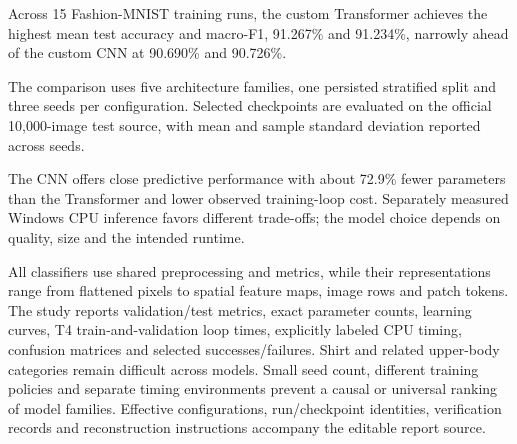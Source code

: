 Across 15 Fashion-MNIST training runs, the custom Transformer achieves the highest
mean test accuracy and macro-F1, 91.267\% and 91.234\%, narrowly ahead of the
custom CNN at 90.690\% and 90.726\%.

The comparison uses five architecture families, one persisted stratified split and
three seeds per configuration. Selected checkpoints are evaluated on the official
10,000-image test source, with mean and sample standard deviation reported across seeds.

The CNN offers close predictive performance with about 72.9\% fewer parameters
than the Transformer and lower observed training-loop cost. Separately measured
Windows CPU inference favors different trade-offs; the model choice depends on
quality, size and the intended runtime.

All classifiers use shared preprocessing and metrics, while their representations
range from flattened pixels to spatial feature maps, image rows and patch tokens.
The study reports validation/test metrics, exact parameter counts, learning curves,
T4 train-and-validation loop times, explicitly labeled CPU timing, confusion
matrices and selected successes/failures. Shirt and related upper-body categories
remain difficult across models. Small seed count, different training policies and
separate timing environments prevent a causal or universal ranking of model families.
Effective configurations, run/checkpoint identities, verification records and
reconstruction instructions accompany the editable report source.
